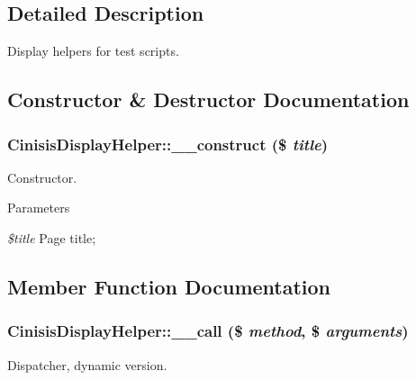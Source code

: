 \subsection{Detailed Description}
Display helpers for test scripts. 

\subsection{Constructor \& Destructor Documentation}
\hypertarget{classCinisisDisplayHelper_ae60a4cc7ad15109c83b3d934f89b283e}{
\subsubsection[{\_\-\_\-construct}]{\setlength{\rightskip}{0pt plus 5cm}CinisisDisplayHelper::\_\-\_\-construct (\$ {\em title})}}
\label{classCinisisDisplayHelper_ae60a4cc7ad15109c83b3d934f89b283e}
Constructor.


\begin{DoxyParams}{Parameters}
\item[{\em \$title}]Page title; \end{DoxyParams}


\subsection{Member Function Documentation}
\hypertarget{classCinisisDisplayHelper_a5601da7181ece90313c1abe2fd0ae621}{
\subsubsection[{\_\-\_\-call}]{\setlength{\rightskip}{0pt plus 5cm}CinisisDisplayHelper::\_\-\_\-call (\$ {\em method}, \/  \$ {\em arguments})}}
\label{classCinisisDisplayHelper_a5601da7181ece90313c1abe2fd0ae621}
Dispatcher, dynamic version.


